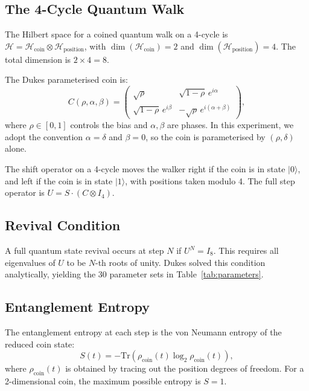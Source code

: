 \documentclass[12pt,a4paper]{article}
\begin{document}
\subsection{The 4-Cycle Quantum Walk}

The Hilbert space for a coined quantum walk on a 4-cycle is $\mathcal{H} = \mathcal{H}_{\text{coin}} \otimes \mathcal{H}_{\text{position}}$, with $\dim(\mathcal{H}_{\text{coin}}) = 2$ and $\dim(\mathcal{H}_{\text{position}}) = 4$. The total dimension is $2 \times 4 = 8$.

The Dukes parameterised coin is:
\begin{equation}
    C(\rho, \alpha, \beta) = 
    \begin{pmatrix}
        \sqrt{\rho} & \sqrt{1-\rho}\,e^{i\alpha} \\[4pt]
        \sqrt{1-\rho}\,e^{i\beta} & -\sqrt{\rho}\,e^{i(\alpha+\beta)}
    \end{pmatrix},
    \label{eq:dukes_coin}
\end{equation}
where $\rho \in [0,1]$ controls the bias and $\alpha, \beta$ are phases. In this experiment, we adopt the convention $\alpha = \delta$ and $\beta = 0$, so the coin is parameterised by $(\rho, \delta)$ alone.

The shift operator on a 4-cycle moves the walker right if the coin is in state $|0\rangle$, and left if the coin is in state $|1\rangle$, with positions taken modulo 4. The full step operator is $U = S \cdot (C \otimes I_4)$.

\subsection{Revival Condition}

A full quantum state revival occurs at step $N$ if $U^N = I_8$. This requires all eigenvalues of $U$ to be $N$-th roots of unity. Dukes solved this condition analytically, yielding the 30 parameter sets in Table~\ref{tab:parameters}.

\subsection{Entanglement Entropy}

The entanglement entropy at each step is the von Neumann entropy of the reduced coin state:
\begin{equation}
    S(t) = -\text{Tr}\left(\rho_{\text{coin}}(t) \log_2 \rho_{\text{coin}}(t)\right),
    \label{eq:entropy}
\end{equation}
where $\rho_{\text{coin}}(t)$ is obtained by tracing out the position degrees of freedom. For a 2-dimensional coin, the maximum possible entropy is $S = 1$.
\end{document}
